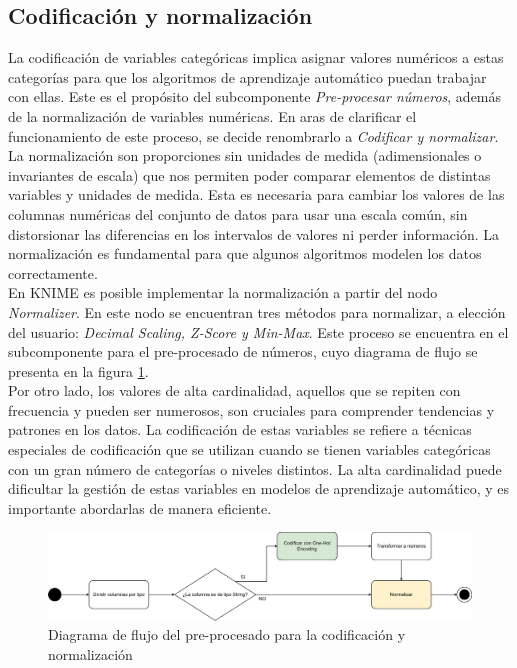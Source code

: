 \subsection{Codificación y normalización}
La codificación de variables categóricas implica asignar valores numéricos a estas categorías para que los algoritmos de aprendizaje automático puedan trabajar con ellas. Este es el propósito del subcomponente \textit{Pre-procesar números}, además de la normalización de variables numéricas. En aras de clarificar el funcionamiento de este proceso, se decide renombrarlo a \textit{Codificar y normalizar}.\\
La normalización son proporciones sin unidades de medida (adimensionales o invariantes de escala) que nos permiten poder comparar elementos de distintas variables y unidades de medida. Esta es necesaria para cambiar los valores de las columnas numéricas del conjunto de datos para usar una escala común, sin distorsionar las diferencias en los intervalos de valores ni perder información. La normalización es fundamental para que algunos algoritmos modelen los datos correctamente. \\
En KNIME es posible implementar la normalización a partir del nodo \textit{Normalizer}. En este nodo se encuentran tres métodos para normalizar, a elección del usuario: \textit{Decimal Scaling, Z-Score y Min-Max}. Este proceso se encuentra en el subcomponente para el pre-procesado de números, cuyo diagrama de flujo se presenta en la figura \ref{fig:number-preprocs}. \\
Por otro lado, los valores de alta cardinalidad, aquellos que se repiten con frecuencia y pueden ser numerosos, son cruciales para comprender tendencias y patrones en los datos. La codificación de estas variables se refiere a técnicas especiales de codificación que se utilizan cuando se tienen variables categóricas con un gran número de categorías o niveles distintos. La alta cardinalidad puede dificultar la gestión de estas variables en modelos de aprendizaje automático, y es importante abordarlas de manera eficiente. \\

\begin{figure}[H]
	\centering
	\includegraphics[width=1\linewidth]{"figuras/capi 2/preprocesado/number preprocs.drawio"}
	\caption{Diagrama de flujo del pre-procesado para la codificación y normalización}
	\label{fig:number-preprocs}
\end{figure}

